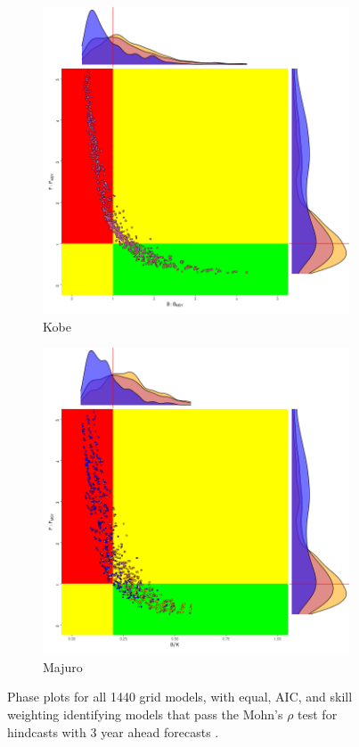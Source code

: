 \begin{figure}
        \begin{subfigure}[b]{0.5\textwidth}
                \includegraphics[width=\linewidth]{figures/kobe-mohn3-1.png}
                \caption{Kobe}
                \label{fig:kobe-wt}
        \end{subfigure}%
        \begin{subfigure}[b]{0.5\textwidth}
                \includegraphics[width=\linewidth]{figures/majuro-mohn3-all-1.png}
                \caption{Majuro}
                \label{fig:majuro-wt}
        \end{subfigure}%
        \caption{Phase plots for all 1440 grid models, with equal, AIC, and skill weighting identifying models that pass the Mohn's $\rho$ test for hindcasts with 3 year ahead forecasts .}
        \label{fig:phase-wt}
\end{figure}


